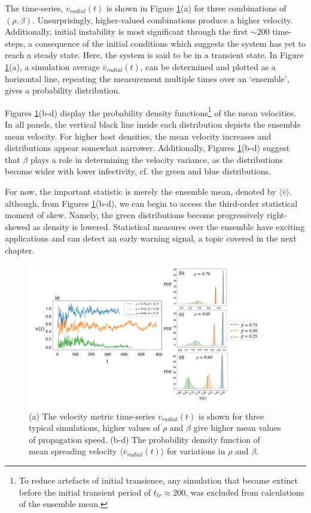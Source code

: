The time-series, $v_{radial}(t)$ is shown in Figure \ref{fig:vel_eff_rad_metric}(a) for three combinations of $(\rho, \beta)$.
Unsurprisingly, higher-valued combinations produce a higher velocity.
Additionally, initial instability is most significant through the first $\sim 200$ time-steps, a consequence of the initial conditions which suggests the system has yet to reach a steady state.
Here, the system is said to be in a transient state.
In Figure \ref{fig:vel_eff_rad_metric}(a), a simulation average $\overline{v}_{radial}(t)$, 
can be determined and plotted as a horizontal line, repeating the measurement multiple times over an `ensemble', gives a probability distribution. 

Figures \ref{fig:vel_eff_rad_metric}(b-d) display the probability density functions\footnote{
To reduce artefacts of initial transience, any simulation that became extinct before the initial transient period 
of $t_{tr}\approx 200$, was excluded from calculations of the ensemble mean.} of the mean velocities.
In all panels, the vertical black line inside each distribution depicts the ensemble mean velocity.
For higher host densities, the mean velocity increases and distributions appear somewhat narrower.
Additionally, Figures \ref{fig:vel_eff_rad_metric}(b-d) suggest that $\beta$ plays a role in determining the velocity variance, as the distributions become wider with lower infectivity, cf. the green and blue distributions.

For now, the important statistic is merely the ensemble mean, denoted by $\big\langle\overline{v}\big\rangle$.
although, from Figures \ref{fig:vel_eff_rad_metric}(b-d), we can begin to access the third-order statistical moment of skew.
Namely, the green distributions become progressively right-skewed as density is lowered.
Statistical measures over the ensemble have exciting applications and can detect an early warning signal, a topic covered in the next chapter.

\begin{figure}
    \centering
    \includegraphics[scale=0.26]{chapter3/figures/figure7.pdf}
    \caption{(a) The velocity metric time-series $v_{radial}(t)$ is shown for three typical simulations, higher values of $\rho$ and $\beta$ give higher mean values of propagation speed. (b-d) The probability density function of mean spreading velocity $\big\langle \overline{v}_{radial}(t) \big\rangle$ for variations in $\rho$ and $\beta$.}
    \label{fig:vel_eff_rad_metric}
\end{figure}

